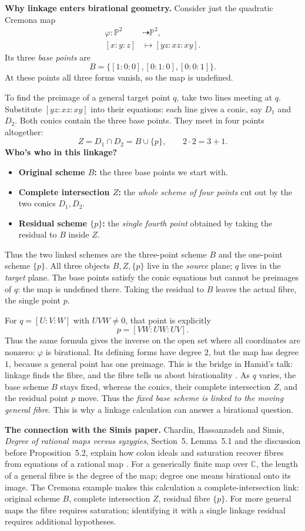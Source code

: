 \medskip\noindent
{\bf Why linkage enters birational
geometry.}
Consider just the quadratic Cremona map
$$
\begin{aligned}
\varphi:\mathbb{P}^2&\dashrightarrow
\mathbb{P}^2,\\
[x:y:z]&\longmapsto[yz:xz:xy].
\end{aligned}
$$
Its three \emph{base points} are
$$
B=\{[1:0:0],[0:1:0],[0:0:1]\}.
$$
At these points all three forms vanish,
so the map is undefined.

To find the preimage of a general target
point $q$, take two lines meeting at $q$.
Substitute $[yz:xz:xy]$ into their
equations: each line gives a conic,
say $D_1$ and $D_2$. Both conics contain
the three base points. They meet in
four points altogether:
$$
Z=D_1\cap D_2=B\cup\{p\},
\qquad 2\cdot2=3+1.
$$
\noindent
{\bf Who's who in this linkage?}
\begin{itemize}
\item \textbf{Original scheme $B$:}
the three base points we start with.
\item \textbf{Complete intersection $Z$:}
the \emph{whole scheme of four points}
cut out by the two conics $D_1,D_2$.
\item \textbf{Residual scheme $\{p\}$:}
the \emph{single fourth point} obtained
by taking the residual to $B$ inside $Z$.
\end{itemize}
Thus the two linked schemes are the
three-point scheme $B$ and the
one-point scheme $\{p\}$.
All three objects $B,Z,\{p\}$ live in
the \emph{source} plane; $q$ lives in
the \emph{target} plane.
The base points satisfy the conic
equations but cannot be preimages of
$q$: the map is undefined there.
Taking the residual to $B$ leaves the
actual fibre, the single point $p$.

For $q=[U:V:W]$ with $UVW\ne0$, that
point is explicitly
$$
p=[VW:UW:UV].
$$
Thus the same formula gives the inverse
on the open set where all coordinates
are nonzero: $\varphi$ is birational.
Its defining forms have degree $2$,
but the map has degree $1$, because a
general point has one preimage.
This is the bridge in Hamid's talk:
linkage finds the fibre, and the fibre
tells us about birationality
\cite{HassanzadehOktobermat2026}.
As $q$ varies, the base scheme $B$
stays fixed, whereas the conics, their
complete intersection $Z$, and the
residual point $p$ move. Thus the
\emph{fixed base scheme is linked to
the moving general fibre}. This is
why a linkage calculation can answer
a birational question.

\medskip\noindent
{\bf The connection with the Simis paper.}
Chardin, Hassanzadeh and Simis,
\emph{Degree of rational maps versus
syzygies}, Section~5, Lemma~5.1 and the
discussion before Proposition~5.2,
explain how colon ideals and saturation
recover fibres from equations of a
rational map
\cite{ChardinHassanzadehSimis2021}.
For a generically finite map over
$\mathbb{C}$, the length of a general
fibre is the degree of the map;
degree one means birational onto its
image. The Cremona example makes this
calculation a complete-intersection
link: original scheme $B$, complete
intersection $Z$, residual fibre
$\{p\}$. For more general maps the
fibre requires saturation; identifying
it with a single linkage residual
requires additional hypotheses.

